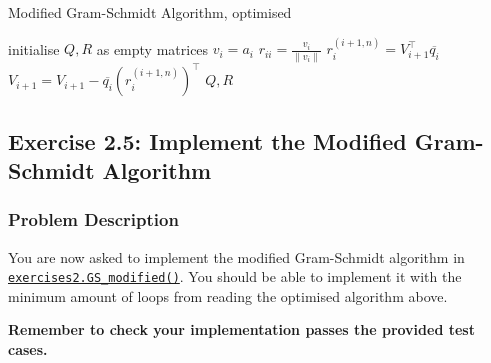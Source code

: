 \begin{algorithm}
  \caption{Modified Gram-Schmidt Algorithm, optimised}
  \label{mgs-algorithm-optimised}
  \begin{algorithmic}[1]
    \State initialise \(Q, R\)  as empty matrices
      \State \(v_i = a_i\)
      \State \(r_{ii} = \frac{v_i}{\|v_i\|}\)
      \State \(r_i^{(i + 1, n)} = V_{i + 1}^{\top}\overline{q_i}\)
      \State \(V_{i + 1} = V_{i + 1} - \overline{q_i} (r_i^{(i + 1, n)})^{\top}\)    
    \EndFor
    \State \Return \(Q, R\)
  \EndProcedure
  \end{algorithmic}
  \end{algorithm}

\subsection*{Exercise 2.5: Implement the Modified Gram-Schmidt Algorithm}
\subsubsection*{Problem Description}%
You are now asked to implement the modified Gram-Schmidt algorithm in \href{https://comp-lin-alg.github.io/cla_utils.html#cla_utils.exercises2.GS_modified}{\texttt{exercises2.GS\_modified()}}. You should be able to implement it with the minimum amount of loops from reading the optimised algorithm above. \medskip

\noindent \textbf{Remember to check your implementation passes the provided test cases.}

